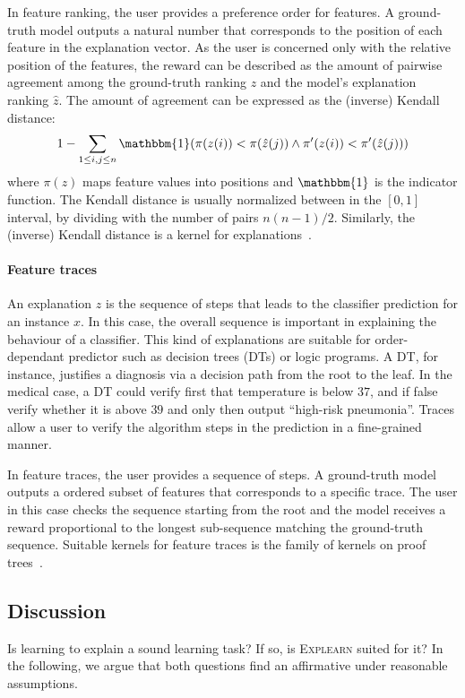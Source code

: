 \documentclass[letterpaper]{article} %
\newcommand{\explearn}{\textsc{Explearn}\xspace}
\begin{document}
In feature ranking, the user provides a preference order for features.
A ground-truth model outputs a natural number that corresponds to the position of each feature in the explanation vector. As the user is concerned only with the relative position of the features, the reward can be described as the amount of pairwise agreement among the ground-truth ranking $z$ and the model's explanation ranking $\hat{z}$. The amount of agreement can be expressed as the (inverse) Kendall distance:
$$
    1 - \sum_{1 \leq i, j \leq n} \mathbbm{1}(\pi(z(i)) < \pi(\hat{z}(j)) \land \pi'(z(i)) < \pi'(\hat{z}(j)))
$$
where $\pi(z)$ maps feature values into positions and $\mathbbm{1}$ is the indicator function. The Kendall distance is usually normalized between in the $[0,1]$ interval, by dividing with the number of pairs $n(n{-}1)/2$.
Similarly, the (inverse) Kendall distance is a kernel for explanations~\cite{jiao2015kendall}.

\paragraph{Feature traces} An explanation $z$ is the sequence of steps that leads to the classifier prediction for an instance $x$. In this case, the overall sequence is important in explaining the behaviour of a classifier. This kind of explanations are suitable for order-dependant predictor such as decision trees (DTs) or logic programs. A DT, for instance, justifies a diagnosis via a decision path from the root to the leaf. In the medical case, a DT could verify first that temperature is below $37$, and if false verify whether it is above $39$ and only then output ``high-risk pneumonia''. Traces allow a user to verify the algorithm steps in the prediction in a fine-grained manner.

In feature traces, the user provides a sequence of steps. A ground-truth model outputs a ordered subset of features that corresponds to a specific trace. The user in this case checks the sequence starting from the root and the model receives a reward proportional to the longest sub-sequence matching the ground-truth sequence. Suitable kernels for feature traces is the family of kernels on proof trees~\cite{passerini2006kernels}.


\subsection{Discussion}

Is learning to explain a sound learning task?  If so, is \explearn suited for it?  In the following, we argue that both questions find an affirmative under reasonable assumptions.
\end{document}
